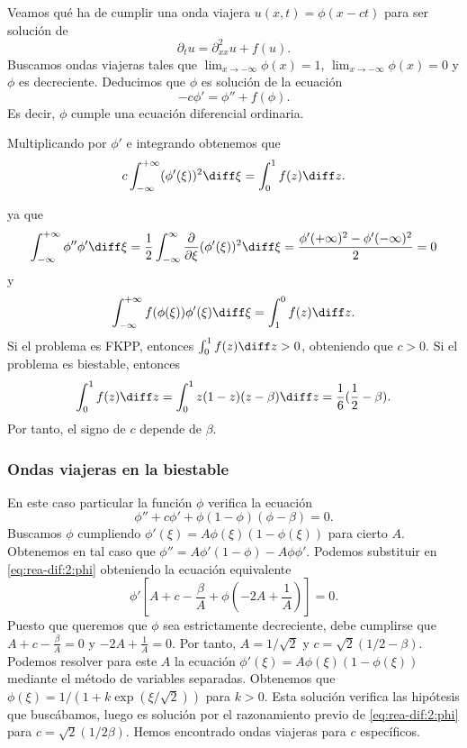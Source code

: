 \documentclass{article}
\begin{document}
Veamos qué ha de cumplir una onda viajera $u(x,t) = \phi(x-ct)$ para ser solución de
\begin{equation}
  \label{eq:rea-dif:f:1}
  \partial_t u = \partial_{xx}^2 u + f(u).
\end{equation}
Buscamos ondas viajeras tales que $\lim_{x \to -\infty} \phi(x) = 1$, $\lim_{x \to -\infty} \phi(x) = 0$
y $\phi$ es decreciente. Deducimos que $\phi$ es solución de la ecuación
\begin{equation}
  \label{eq:rea-dif:f:phi}
  -c \phi' = \phi'' + f(\phi).
\end{equation}
Es decir, $\phi$ cumple una ecuación diferencial ordinaria. 

Multiplicando por $\phi'$ e integrando
obtenemos que
\[ c \int_{-\infty}^{+\infty} (\phi'(\xi))^2 \diff \xi = \int_0^1 f(z) \diff z.\]

ya que
\[ \int_{-\infty}^{+\infty} \phi'' \phi' \diff \xi = \frac{1}{2} \int_{-\infty}^{\infty}
  \frac{\partial}{\partial \xi} (\phi'(\xi))^2 \diff \xi = \frac{\phi'(+\infty)^2 -
    \phi'(-\infty)^2}{2} = 0\] y
\[ \int_{-\infty}^{+\infty} f(\phi(\xi)) \phi'(\xi) \diff \xi = \int_1^0 f(z) \diff z.\]
Si el problema es FKPP, entonces $\int_0^1 f(z) \diff z > 0$, obteniendo que $c >0$. Si el problema es biestable, entonces
\[ \int_0^1 f(z) \diff z = \int_0^1 z(1-z)(z-\beta) \diff z = \frac{1}{6}(\frac{1}{2} - \beta).\]
Por tanto, el signo de $c$ depende de $\beta$. 

\subsubsection{Ondas viajeras en la biestable}

En este caso particular la función $\phi$ verifica la ecuación
\begin{equation}
  \label{eq:rea-dif:2:phi}
  \phi'' + c \phi' + \phi(1-\phi)(\phi - \beta) = 0.
\end{equation}
Buscamos $\phi$ cumpliendo $\phi'(\xi) = A\phi(\xi)(1-\phi(\xi))$ para cierto $A$. Obtenemos en tal caso que
$\phi'' = A \phi'(1-\phi) - A \phi \phi'$. Podemos substituir en \eqref{eq:rea-dif:2:phi} obteniendo la ecuación equivalente 
\[ \phi' \left[ A + c - \frac{\beta}{A} + \phi \left( -2A + \frac{1}{A} \right) \right] = 0.\]
Puesto que queremos que $\phi$ sea estrictamente decreciente, debe cumplirse que $A + c - \frac{\beta}{A} = 0$ y $-2A + \frac{1}{A} = 0$. Por tanto, $A = 1 / \sqrt{2}$ y $c = \sqrt{2}(1/2 - \beta)$. Podemos resolver para este $A$ la ecuación $\phi'(\xi) = A\phi(\xi)(1-\phi(\xi))$ mediante el método de variables separadas. Obtenemos que $\phi(\xi) = 1 / (1 + k \exp(\xi / \sqrt{2}))$ para $k > 0$. Esta solución verifica las hipótesis que buscábamos, luego es solución por el razonamiento previo de \eqref{eq:rea-dif:2:phi} para $c = \sqrt{2} (1/2  \beta)$. Hemos encontrado ondas viajeras para $c$ específicos.
\end{document}
